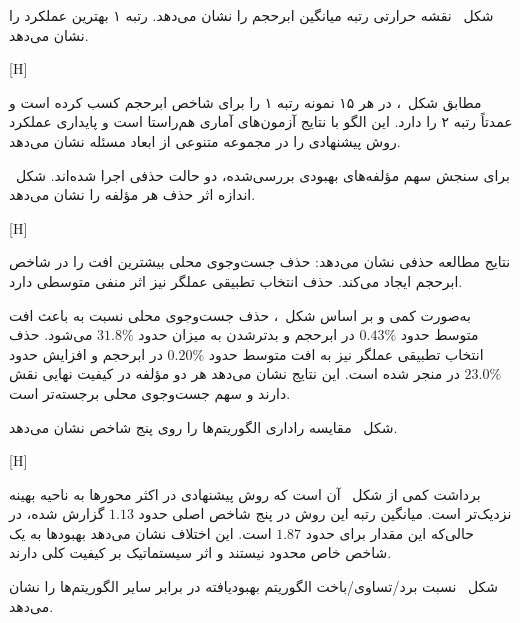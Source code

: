 
شکل~ نقشه حرارتی رتبه میانگین ابرحجم را نشان می‌دهد.
رتبه ۱ بهترین عملکرد را نشان می‌دهد.

[H]

مطابق شکل~،  در هر ۱۵ نمونه رتبه ۱ را
برای شاخص ابرحجم کسب کرده است و  عمدتاً رتبه ۲ را دارد.
این الگو با نتایج آزمون‌های آماری هم‌راستا است و پایداری عملکرد روش پیشنهادی
را در مجموعه متنوعی از ابعاد مسئله نشان می‌دهد.



برای سنجش سهم مؤلفه‌های بهبودی بررسی‌شده، دو حالت حذفی اجرا شده‌اند.
شکل~ اندازه اثر حذف هر مؤلفه را نشان می‌دهد.

[H]

نتایج مطالعه حذفی نشان می‌دهد:
 حذف جست‌وجوی محلی بیشترین افت را در شاخص ابرحجم ایجاد می‌کند.
 حذف انتخاب تطبیقی عملگر نیز اثر منفی متوسطی دارد.

به‌صورت کمی و بر اساس شکل~، حذف جست‌وجوی محلی نسبت به
 باعث افت متوسط حدود $0.43\%$ در ابرحجم و بدترشدن
 به میزان حدود $31.8\%$ می‌شود. حذف انتخاب تطبیقی عملگر نیز
به افت متوسط حدود $0.20\%$ در ابرحجم و افزایش حدود $23.0\%$ در 
منجر شده است. این نتایج نشان می‌دهد هر دو مؤلفه در کیفیت نهایی نقش دارند
و سهم جست‌وجوی محلی برجسته‌تر است.



شکل~ مقایسه راداری الگوریتم‌ها را روی پنج شاخص نشان می‌دهد.

[H]

برداشت کمی از شکل~ آن است که روش پیشنهادی در اکثر محورها
به ناحیه بهینه نزدیک‌تر است. میانگین رتبه این روش در پنج شاخص اصلی
حدود $1.13$ گزارش شده، در حالی‌که این مقدار برای 
حدود $1.87$ است. این اختلاف نشان می‌دهد بهبودها به یک شاخص خاص محدود نیستند
و اثر سیستماتیک بر کیفیت کلی دارند.

شکل~ نسبت برد/تساوی/باخت الگوریتم بهبودیافته در برابر سایر الگوریتم‌ها را نشان می‌دهد.

